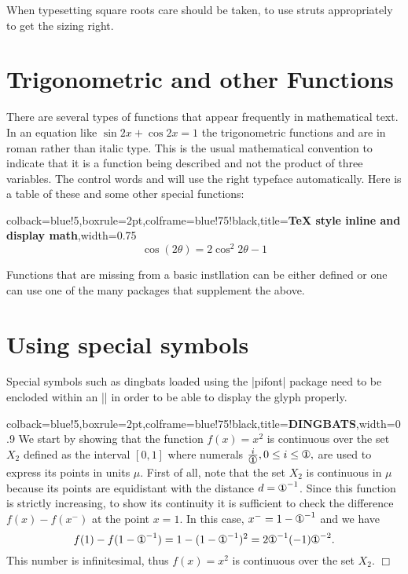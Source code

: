 When typesetting square roots care should be taken, to use struts appropriately to get the sizing right.

\section{Trigonometric and other Functions}
There are several types of functions that appear frequently in mathematical text. In
an equation like $\sin2x+\cos2x=1$ the trigonometric functions  and  are in
roman rather than italic type. This is the usual mathematical convention to indicate that
it is a function being described and not the product of three variables. The control words
 and  will use the right typeface automatically. Here is a table of these and some
other special functions:

\begin{teX}
\sin \cos \tan \cot \sec \csc \arcsin \arccos
\arctan \sinh \cosh \tanh \coth \lim \sup \inf
\limsup \liminf \log \ln \lg \exp \det \deg
\dim \hom \ker \max \min \arg \gcd \Pr
\end{teX}

\begin{tcblisting}{colback=blue!5,boxrule=2pt,colframe=blue!75!black,title=\textbf{TeX style inline and display math},width=0.75\textwidth}
\[ \cos(2\theta) = 2 \cos^{2}2 \theta-1\]
\end{tcblisting}

Functions that are missing from a basic instllation can be either defined or one can use one of the many packages that supplement the above.

\clearpage

\section{Using special symbols}

Special symbols such as dingbats loaded using the |pifont| package need to be encloded within an |\mbox| in order to be able to display the glyph properly.
\bigskip

\begin{tcblisting}{colback=blue!5,boxrule=2pt,colframe=blue!75!black,title=\textbf{DINGBATS},width=0.9\textwidth}
\label{e14}
 We start by showing that the function $f(x)=x^2$ is
continuous over the set $X_2$\label{p:X2} defined as the interval
$[0,1]$ where numerals $\frac{i}{\mbox{\ding{172}}}, 0 \le i \le
\mbox{\ding{172}},$ are used to express its points in units $\mu$.
First of all, note that the set $X_2$ is continuous in   $\mu$
because its points are equidistant with the distance
$d=\mbox{\ding{172}}^{-1}$. Since this function is strictly
increasing,  to show its continuity it is sufficient to check the
difference $f(x)-f(x^{-})$ at the point $x=1$. In this case,
$x^{-}=1-\mbox{\ding{172}}^{-1}$ and we have
\[
 f(1)-f(1-\mbox{\ding{172}}^{-1})=
 1-(1-\mbox{\ding{172}}^{-1})^2 =
 2\mbox{\ding{172}}^{-1}(-1)\mbox{\ding{172}}^{-2}.
\]
This number is infinitesimal, thus $f(x)=x^2$ is continuous over
the set $X_2$. \hfill $\Box$
\end{tcblisting}
\bigskip

